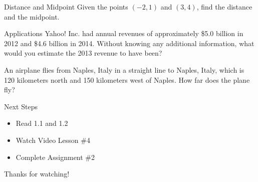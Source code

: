 \documentclass{beamer}
\begin{document}
\begin{frame}[t]{Distance and Midpoint}
Given the points $(-2, 1)$ and $(3, 4)$, find the distance and the midpoint.
\end{frame}

\begin{frame}[t]{Applications}
Yahoo! Inc. had annual revenues of approximately \$5.0 billion in 2012 and \$4.6 billion in 2014. Without knowing any additional information, what would you estimate the 2013 revenue to have been?

\vfill \pause

An airplane flies from Naples, Italy in a straight line to Naples, Italy, which is 120 kilometers north and 150 kilometers west of Naples. How far does the plane fly?

\end{frame}

\begin{frame}[t]{Next Steps}
\begin{itemize}
\item Read 1.1 and 1.2
\item Watch Video Lesson \#4
\item Complete Assignment \#2
\end{itemize}

\vfill

Thanks for watching!
\end{frame}
\end{document}
